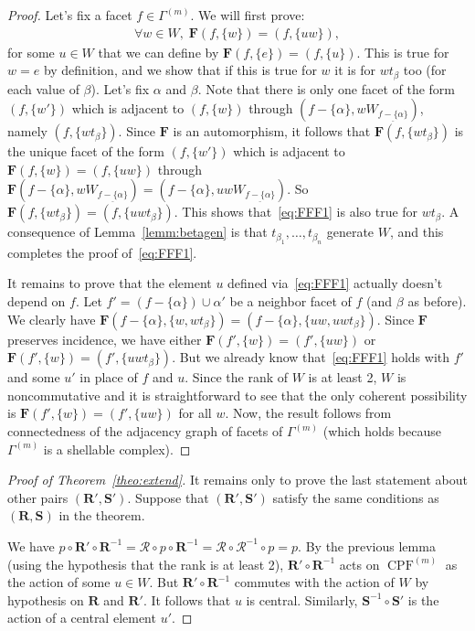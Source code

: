 \documentclass[11pt]{article}
\theoremstyle{definition}
\newcommand{\RR}{\mathcal{R}}
\newcommand{\FFF}{\mathbf{F}}
\newcommand{\RRR}{\mathbf{R}}
\newcommand{\SSS}{\mathbf{S}}
\DeclareMathOperator{\CPF}{CPF}
\begin{document}
\begin{proof}
    Let's fix a facet $f\in \Gamma^{(m)}$.  We will first prove: 
    \begin{align} \label{eq:FFF1}
        \forall w\in W, \; \FFF(f,\{w\}) = (f,\{uw\}),
    \end{align}
    for some $u\in W$ that we can define by $\FFF(f,\{e\}) = (f,\{u\})$. This is true for $w=e$ by definition, and we show that if this is true for $w$ it is for $wt_\beta$ too (for each value of $\beta$).  Let's fix $\alpha$ and $\beta$.  Note that there is only one facet of the form $(f,\{w'\})$ which is adjacent to $(f,\{w\})$ through $(f-\{\alpha\},wW_{\underline{f-\{\alpha\}}})$, namely $(f,\{wt_\beta\})$.  Since $\FFF$ is an automorphism, it follows that $\FFF(f,\{wt_\beta\})$ is the unique facet of the form $(f,\{w'\})$ which is adjacent to $\FFF(f,\{w\}) = (f,\{uw\})$ through $\FFF(f-\{\alpha\},wW_{\underline{f-\{\alpha\}}}) = (f-\{\alpha\},uwW_{\underline{f-\{\alpha\}}})$.  So $\FFF(f,\{wt_\beta\}) = (f,\{uwt_\beta\})$.  This shows that~\eqref{eq:FFF1} is also true for $wt_\beta$.  A consequence of Lemma~\ref{lemm:betagen} is that $t_{\beta_1},\dots,t_{\beta_n}$ generate $W$, and this completes the proof of~\eqref{eq:FFF1}.

    It remains to prove that the element $u$ defined via~\eqref{eq:FFF1} actually doesn't depend on $f$.  Let $f' = (f-\{\alpha\})\cup \alpha'$ be a neighbor facet of $f$ (and $\beta$ as before).  We clearly have $\FFF(f-\{\alpha\},\{w,wt_\beta\}) = (f-\{\alpha\},\{u w , u w t_\beta\})$.  Since $\FFF$ preserves incidence, we have either $\FFF(f',\{w\}) = (f',\{u w\})$ or $\FFF(f',\{w\}) = (f',\{u w t_\beta\})$.  But we already know that~\eqref{eq:FFF1} holds with $f'$ and some $u'$ in place of $f$ and $u$.  Since the rank of $W$ is at least 2, $W$ is noncommutative and it is straightforward to see that the only coherent possibility is $\FFF(f',\{w\}) = (f',\{u w\})$ for all $w$.  Now, the result follows from connectedness of the adjacency graph of facets of $\Gamma^{(m)}$ (which holds because $\Gamma^{(m)}$ is a shellable complex).
\end{proof}

\begin{proof}[Proof of Theorem~\ref{theo:extend}]
    It remains only to prove the last statement about other pairs $(\RRR',\SSS')$.  Suppose that $(\RRR',\SSS')$ satisfy the same conditions as $(\RRR,\SSS)$ in the theorem.  

    We have $p\circ \RRR'\circ \RRR^{-1} = \RR \circ p \circ \RRR^{-1} = \RR \circ \RR^{-1} \circ p = p$.  By the previous lemma (using the hypothesis that the rank is at least 2), $\RRR'\circ \RRR^{-1}$ acts on $\CPF^{(m)}$ as the action of some $u\in W$.  But $\RRR'\circ \RRR^{-1}$ commutes with the action of $W$ by hypothesis on $\RRR$ and $\RRR'$.  It follows that $u$ is central.  Similarly, $\SSS^{-1} \circ \SSS'$ is the action of a central element $u'$.  
\end{proof}
\end{document}
